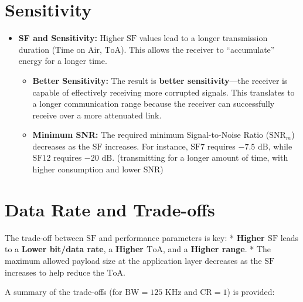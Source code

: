 \documentclass[a4paper, 12pt]{book} %
\begin{document}
\section{Sensitivity}\label{sensitivity}

\begin{itemize}
\tightlist
\item
  \textbf{SF and Sensitivity:} Higher \(\text{SF}\) values lead to a
  longer transmission duration (Time on Air, \(\text{ToA}\)). This
  allows the receiver to ``accumulate'' energy for a longer time.

  \begin{itemize}
  \tightlist
  \item
    \textbf{Better Sensitivity:} The result is \textbf{better
    sensitivity}---the receiver is capable of effectively receiving more
    corrupted signals. This translates to a longer communication range
    because the receiver can successfully receive over a more attenuated
    link.
  \item
    \textbf{Minimum SNR:} The required minimum Signal-to-Noise Ratio
    (\(\text{SNR}_m\)) decreases as the \(\text{SF}\) increases. For
    instance, \(\text{SF}7\) requires \(-7.5 \text{ dB}\), while
    \(\text{SF}12\) requires \(-20 \text{ dB}\). (transmitting for a
    longer amount of time, with higher consumption and lower SNR)
  \end{itemize}
\end{itemize}

\section{Data Rate and Trade-offs}\label{data-rate-and-trade-offs}

The trade-off between \(\text{SF}\) and performance parameters is key: *
\textbf{Higher \(\text{SF}\)} leads to a \textbf{Lower bit/data rate}, a
\textbf{Higher \(\text{ToA}\)}, and a \textbf{Higher range}. * The
maximum allowed payload size at the application layer decreases as the
\(\text{SF}\) increases to help reduce the \(\text{ToA}\).

A summary of the trade-offs (for \(\text{BW}=125 \text{ KHz}\) and
\(\text{CR}=1\)) is provided:
\end{document}

